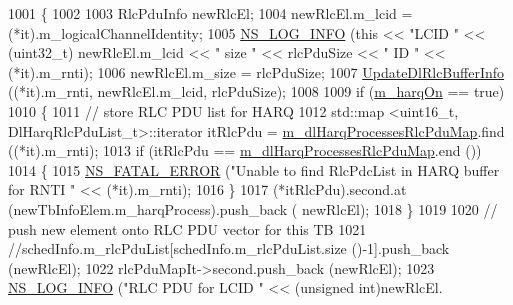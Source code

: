 \begin{DoxyCode}
{1001                         \{
1002 
1003                                 RlcPduInfo newRlcEl;
1004                                 newRlcEl.m\_lcid = (*it).m\_logicalChannelIdentity;
1005                                 \hyperlink{group__logging_gafbd73ee2cf9f26b319f49086d8e860fb}{NS\_LOG\_INFO} (\textcolor{keyword}{this} << \textcolor{stringliteral}{"LCID "} << (uint32\_t) newRlcEl.m\_lcid << \textcolor{stringliteral}{"
       size "} << rlcPduSize << \textcolor{stringliteral}{" ID "} << (*it).m\_rnti);
1006                                 newRlcEl.m\_size = rlcPduSize;
1007                                 \hyperlink{classns3_1_1MmWaveRrMacScheduler_a005e51f10e6d477bf11d6993f081ed24}{UpdateDlRlcBufferInfo} ((*it).m\_rnti, newRlcEl.m\_lcid, 
      rlcPduSize);
1008 
1009                                 \textcolor{keywordflow}{if} (\hyperlink{classns3_1_1MmWaveRrMacScheduler_ad8bb79b5853000b363b42a158633a942}{m\_harqOn} == \textcolor{keyword}{true})
1010                                 \{
1011                                         \textcolor{comment}{// store RLC PDU list for HARQ}
1012                                         std::map <uint16\_t, DlHarqRlcPduList\_t>::iterator itRlcPdu =  
      \hyperlink{classns3_1_1MmWaveRrMacScheduler_a51e5c8d3c34be4e070f2fb3e621cd418}{m\_dlHarqProcessesRlcPduMap}.find ((*it).m\_rnti);
1013                                         \textcolor{keywordflow}{if} (itRlcPdu == 
      \hyperlink{classns3_1_1MmWaveRrMacScheduler_a51e5c8d3c34be4e070f2fb3e621cd418}{m\_dlHarqProcessesRlcPduMap}.end ())
1014                                         \{
1015                                                 \hyperlink{group__fatal_ga5131d5e3f75d7d4cbfd706ac456fdc85}{NS\_FATAL\_ERROR} (\textcolor{stringliteral}{"Unable to find RlcPdcList in
       HARQ buffer for RNTI "} << (*it).m\_rnti);
1016                                         \}
1017                                         (*itRlcPdu).second.at (newTbInfoElem.m\_harqProcess).push\_back (
      newRlcEl);
1018                                 \}
1019 
1020                                 \textcolor{comment}{// push new element onto RLC PDU vector for this TB}
1021                                 \textcolor{comment}{//schedInfo.m\_rlcPduList[schedInfo.m\_rlcPduList.size ()-1].push\_back
       (newRlcEl);}
1022                                 rlcPduMapIt->second.push\_back (newRlcEl);
1023                                 \hyperlink{group__logging_gafbd73ee2cf9f26b319f49086d8e860fb}{NS\_LOG\_INFO} (\textcolor{stringliteral}{"RLC PDU for LCID "} << (\textcolor{keywordtype}{unsigned} \textcolor{keywordtype}{int})newRlcEl.
}
\end{DoxyCode}
